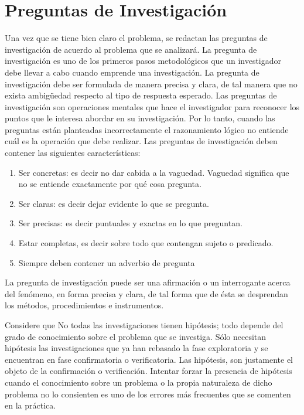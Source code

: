 \documentclass[12]{informe_investigacion}
\begin{document}
\section{Preguntas de Investigación}
Una vez que se tiene bien claro el problema, se redactan las preguntas de investigación de acuerdo al problema que se analizará. La pregunta de investigación es uno de los primeros pasos metodológicos que un investigador debe llevar a cabo cuando emprende una investigación. La pregunta de investigación debe ser formulada de manera precisa y clara, de tal manera que no exista ambigüedad respecto al tipo de respuesta esperado.
Las preguntas de investigación son operaciones mentales que hace el investigador para reconocer los puntos que le interesa abordar en su investigación. Por lo tanto, cuando las preguntas están planteadas incorrectamente el razonamiento lógico no entiende cuál es la operación que debe realizar. Las preguntas de investigación deben contener las siguientes características:
\begin{enumerate}
    \item Ser concretas: es decir no dar cabida a la vaguedad. Vaguedad significa que no se entiende exactamente por qué cosa pregunta.
    \item Ser claras: es decir dejar evidente lo que se pregunta.
    \item Ser precisas: es decir puntuales y exactas en lo que preguntan.
    \item Estar completas, es decir sobre todo que contengan sujeto o predicado.
    \item Siempre deben contener un adverbio de pregunta
\end{enumerate}

La pregunta de investigación puede ser una afirmación o un interrogante acerca del fenómeno, en forma precisa y clara, de tal forma que de ésta se desprendan los métodos, procedimientos e instrumentos.

Considere que No todas las investigaciones tienen hipótesis; todo depende del grado de conocimiento sobre el problema que se investiga. Sólo necesitan hipótesis las investigaciones que ya han rebasado la fase exploratoria y se encuentran en fase confirmatoria o verificatoria. Las hipótesis, son justamente el objeto de la confirmación o verificación. Intentar forzar la presencia de hipótesis cuando el conocimiento sobre un problema o la propia naturaleza de dicho problema no lo consienten es uno de los errores más frecuentes que se comenten en la práctica.
\end{document}
